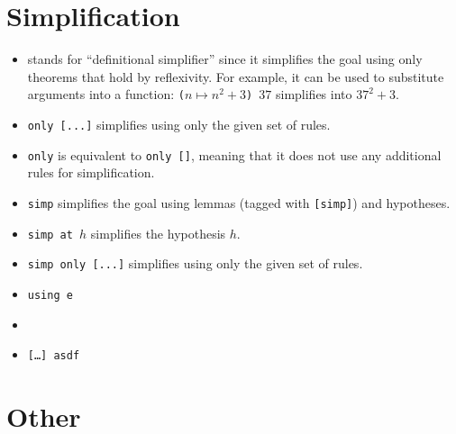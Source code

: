 \documentclass[a4paper]{article}
\begin{document}
\section{Simplification}


\begin{itemize}
    \item \dsimp stands for ``definitional simplifier'' since it simplifies the goal using only theorems that hold by reflexivity.
    For example, it can be used to substitute arguments into a function: \texttt{(\fun $n \mapsto n^2 + 3$) $37$} simplifies into $37^2+3$.
    \item \texttt{\dsimp only [...]} simplifies using only the given set of rules.
    \item \texttt{\dsimp only} is equivalent to \texttt{\dsimp only []}, meaning that it does not use any additional rules for simplification.
\end{itemize}


\begin{itemize}
    \item \texttt{simp} simplifies the goal using lemmas (tagged with \texttt{[simp]}) and hypotheses.
    \item \texttt{simp at $h$} simplifies the hypothesis $h$.
    \item \texttt{simp only [...]} simplifies using only the given set of rules.
\end{itemize}



\begin{itemize}
    \item \texttt{ using e}
    \item \texttt{}
    \item \texttt{[\ldots] asdf}
\end{itemize}



\section{Other}

\end{document}
